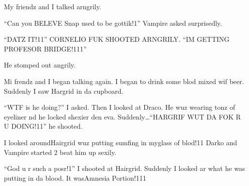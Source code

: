 My friendz and I talked arngrily.

\enquote{Can you BELEVE Snap used to be gottik!1} Vampire asked surprisedly.

\enquote{DATZ IT!11} CORNELIO FUK SHOOTED ARNGRILY\@. \enquote{IM GETTING PROFESOR BRIDGE!111}

He stomped out angrily.

Mi frendz and I began talking again. I began to drink some blod mixed wif beer. Suddenly I saw Hargrid in da cupboard.

\begin{sloppypar}
    \enquote{WTF is he doing?} I asked. Then I looked at Draco. He wuz wearing tonz of eyeliner nd he locked shexier den eva. Suddenly\ldots\newline\dotfill\enquote{HARGRIF WUT DA FOK R U DOING!11} he shooted.
\end{sloppypar}

I looked around\dotfill Hairgrid wuz putting sumfing in my\newline glass of blod!11 Darko and Vampire started 2 beat him up sexily.

\enquote{God u r such a posr!1} I shooted at Hairgrid. Suddenly I looked ar what he was putting in da blood. It was\dotfill\newline Amnesia Portion!111
